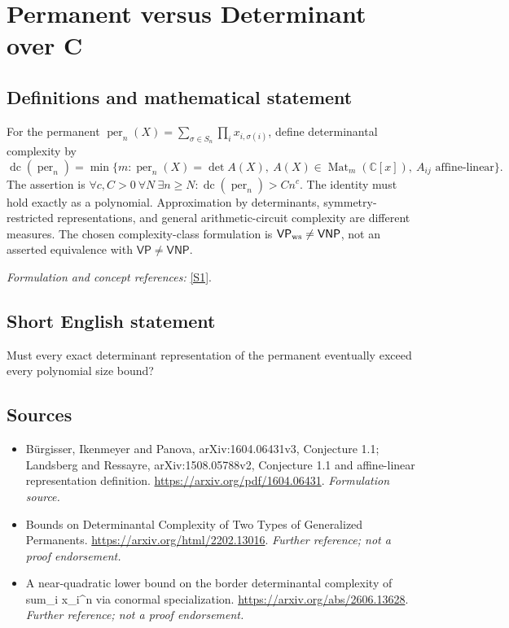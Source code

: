 \documentclass[11pt]{article}
\begin{document}
\section*{\texorpdfstring{Permanent versus Determinant over C}{Permanent versus Determinant over C}}\label{57}
\subsection{Definitions and mathematical statement}
For the permanent $\operatorname{per}_n(X)=\sum_{\sigma\in S_n}\prod_i x_{i,\sigma(i)}$, define determinantal complexity by
\[
 \operatorname{dc}(\operatorname{per}_n)=\min\{m:\operatorname{per}_n(X)=\det A(X),\
 A(X)\in\operatorname{Mat}_m({\mathbb{C}}[x]),\ A_{ij}\text{ affine-linear}\}.
\]
The assertion is $\forall c,C>0\ \forall N\ \exists n\ge N:\operatorname{dc}(\operatorname{per}_n)>Cn^c$. The identity must hold exactly as a polynomial. Approximation by determinants, symmetry-restricted representations, and general arithmetic-circuit complexity are different measures. The chosen complexity-class formulation is $\mathsf{VP}_{\rm ws}\ne\mathsf{VNP}$, not an asserted equivalence with $\mathsf{VP}\ne\mathsf{VNP}$.
\par\smallskip\textit{Formulation and concept references:} \href{https://arxiv.org/pdf/1604.06431}{[S1]}.

\subsection{Short English statement}
Must every exact determinant representation of the permanent eventually exceed every polynomial size bound?
\subsection{Sources}
\begin{itemize}
\item[S1]Bürgisser, Ikenmeyer and Panova, arXiv:1604.06431v3, Conjecture 1.1; Landsberg and Ressayre, arXiv:1508.05788v2, Conjecture 1.1 and affine-linear representation definition.
\url{https://arxiv.org/pdf/1604.06431}.
\textit{Formulation source.}
\item[S2]Bounds on Determinantal Complexity of Two Types of Generalized Permanents.
\url{https://arxiv.org/html/2202.13016}.
\textit{Further reference; not a proof endorsement.}
\item[S3]A near-quadratic lower bound on the border determinantal complexity of sum\_i x\_i\textasciicircum{}n via conormal specialization.
\url{https://arxiv.org/abs/2606.13628}.
\textit{Further reference; not a proof endorsement.}
\end{itemize}
\end{document}
